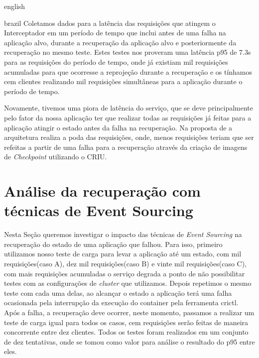 \begin{otherlanguage*}{english}
\begin{otherlanguage*}{brazil}
Coletamos dados para a latência das requisições que atingem o Interceptador em um período de
tempo que inclui antes de uma falha na aplicação alvo, durante a recuperação da aplicação
alvo e posteriormente da recuperação no mesmo teste. Estes testes nos proveram uma latência
p95 de 7.3s para as requisições do período de tempo, onde já existiam mil requisições
acumuladas para que ocorresse a reprojeção durante a recuperação e os tínhamos cem clientes
realizando mil requisições simultâneas para a aplicação durante o período de tempo.

Novamente, tivemos uma piora de latência do serviço, que se deve principalmente pelo fator
da nossa aplicação ter que realizar todas as requisições já feitas para a aplicação atingir
o estado antes da falha na recuperação. Na proposta de \cite{muller2022architecture} a
arquitetura realiza a poda das requisições, onde, menos requisições teriam que ser refeitas
a partir de uma falha para a recuperação através da criação de imagens de \textit{Checkpoint}
utilizando o CRIU.

\section{Análise da recuperação com técnicas de Event Sourcing}

Nesta Seção queremos investigar o impacto das técnicas de \textit{Event Sourcing} na
recuperação do estado de uma aplicação que falhou. Para isso, primeiro utilizamos nosso teste
de carga para levar a aplicação até um estado, com mil requisições(caso A), dez mil
requisições(caso B) e vinte mil requisições(caso C), com mais requisições acumuladas o serviço
degrada a ponto de não possibilitar testes com as configurações de \textit{cluster} que utilizamos.
Depois repetimos o mesmo teste com cada uma delas, ao alcançar o estado a aplicação terá uma falha
ocasionada pela interrupção da execução do container pela ferramenta crictl. Após a falha,
a recuperação deve ocorrer, neste momento, passamos a realizar um teste de carga igual para
todos os casos, cem requisições serão feitas de maneira concorrente entre dez clientes. Todos
os testes foram realizados em um conjunto de dez tentativas, onde se tomou como valor para análise
o resultado do p95 entre eles.


\end{otherlanguage*}
\end{otherlanguage*}
